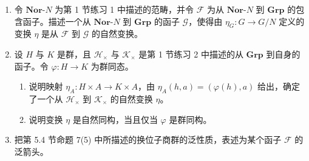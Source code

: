 \begin{enumerate}[label=\arabic*.]
  \item 令 $\mathbf{Nor}\text{-}N$ 为第 1 节练习 1 中描述的范畴，并令 $\mathcal F$ 为从 $\mathbf{Nor}\text{-}N$ 到 $\mathbf{Grp}$ 的包含函子。描述一个从 $\mathbf{Nor}\text{-}N$ 到 $\mathbf{Grp}$ 的函子 $\mathcal G$，使得由 $\eta_G:G\to G/N$ 定义的变换 $\eta$ 是从 $\mathcal F$ 到 $\mathcal G$ 的自然变换。

  \item 设 $H$ 与 $K$ 是群，且 $\mathcal H_{\times}$ 与 $\mathcal K_{\times}$ 是第 1 节练习 2 中描述的从 $\mathbf{Grp}$ 到自身的函子。令 $\varphi:H\to K$ 为群同态。
  \begin{enumerate}[label=(\alph*)]
    \item 说明映射 $\eta_A:H\times A\to K\times A$，由 $\eta_A(h,a)=(\varphi(h),a)$ 给出，确定了一个从 $\mathcal H_{\times}$ 到 $\mathcal K_{\times}$ 的自然变换 $\eta$。
    \item 说明变换 $\eta$ 是自然同构，当且仅当 $\varphi$ 是群同构。
  \end{enumerate}

  \item 把第 5.4 节命题 7(5) 中所描述的换位子商群的泛性质，表述为某个函子 $\mathcal F$ 的泛箭头。
\end{enumerate}
